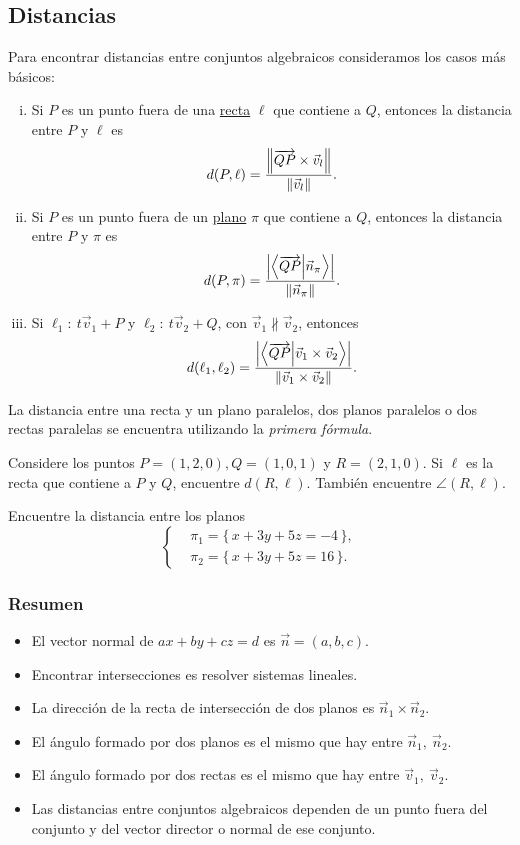 \documentclass[12pt]{article}
\theoremstyle{plain}
\theoremstyle{definition}
\theoremstyle{remark}
\renewcommand{\l}{\ell}
\newcommand{\x}{\times}             %
\renewcommand{\:}{\colon}           %
\newcommand{\un}[1]{\underline{#1}}
\renewcommand{\.}{\Cdot}                %
\newcommand{\vaf}{\overrightarrow}
\newcommand{\set}[1]{\{\,#1\,\}}    %
\begin{document}
\begin{multicols}{2}
\subsection*{Distancias}
Para encontrar distancias entre conjuntos algebraicos consideramos los casos más básicos:
\begin{enumerate}[i)]
  \item Si $P$ es un punto fuera de una \un{recta} $\l$ que contiene a $Q$, entonces la distancia entre $P$ y $\l$ es 
  $$d(P,\l)=\frac{\norm{\vaf{QP}\x\vec{v}_l}}{\norm{\vec{v}_l}}.$$
  \item Si $P$ es un punto fuera de un \un{plano} $\pi$ que contiene a $Q$, entonces la distancia entre $P$ y $\pi$ es 
  $$d(P,\pi)=\frac{\left|\braket{\vaf{QP}}{\vec{n}_\pi}\right|}{\norm{\vec{n}_\pi}}.$$
  \item Si $\l_1:\ t\vec{v}_1+P$ y $\l_2:\ t\vec{v}_2+Q$, con $\vec{v}_1\not\parallel\vec{v}_2$, entonces
  $$d(\l_1,\l_2)=\frac{\left|\braket{\vaf{QP}}{\vec{v}_1\x\vec{v}_2}\right|}{\norm{\vec{v}_1\x\vec{v}_2}}.$$
\end{enumerate}
La distancia entre una recta y un plano paralelos, dos planos paralelos o dos rectas paralelas se encuentra utilizando la \emph{primera fórmula}.

\begin{ptcbP}
  Considere los puntos $P=(1,2,0), Q=(1,0,1)$ y $R=(2,1,0)$. Si $\l$ es la recta que contiene a $P$ y $Q$, encuentre $d(R,\l)$. También encuentre $\angle(R,\l)$.
\end{ptcbP}

\begin{ptcbP}
  Encuentre la distancia entre los planos 
  $$
  \left\lbrace
  \begin{aligned}
    &\pi_1=\set{x+3y+5z=-4},\\
    &\pi_2=\set{x+3y+5z=16}.
  \end{aligned}
  \right.
  $$
\end{ptcbP}
\subsubsection*{Resumen}
\begin{itemize}
  \itemsep=-0.4em
  \item El vector normal de $ax+by+cz=d$ es $\vec{n}=(a,b,c)$.
  \item Encontrar intersecciones es resolver sistemas lineales.
  \item La dirección de la recta de intersección de dos planos es $\vec n_1\x\vec n_2$.
  \item El ángulo formado por dos planos es el mismo que hay entre $\vec n_1,\ \vec n_2$.
  \item El ángulo formado por dos rectas es el mismo que hay entre $\vec v_1,\ \vec v_2$.
  \item Las distancias entre conjuntos algebraicos dependen de un punto fuera del conjunto y del vector director o normal de ese conjunto.
\end{itemize}
\end{multicols}
\end{document}
